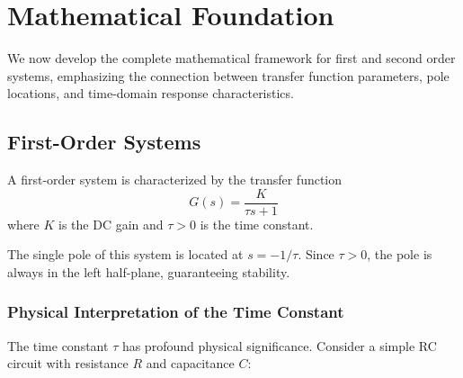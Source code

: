 \section{Mathematical Foundation}

We now develop the complete mathematical framework for first and second order systems, emphasizing the connection between transfer function parameters, pole locations, and time-domain response characteristics.

\subsection{First-Order Systems}

\begin{definition}
A first-order system is characterized by the transfer function
\begin{equation}
G(s) = \frac{K}{\tau s + 1}
\label{eq:first_order_tf}
\end{equation}
where $K$ is the DC gain and $\tau > 0$ is the time constant.
\end{definition}

The single pole of this system is located at $s = -1/\tau$. Since $\tau > 0$, the pole is always in the left half-plane, guaranteeing stability.

\subsubsection{Physical Interpretation of the Time Constant}

The time constant $\tau$ has profound physical significance. Consider a simple RC circuit with resistance $R$ and capacitance $C$:

\begin{center}
\end{center}

